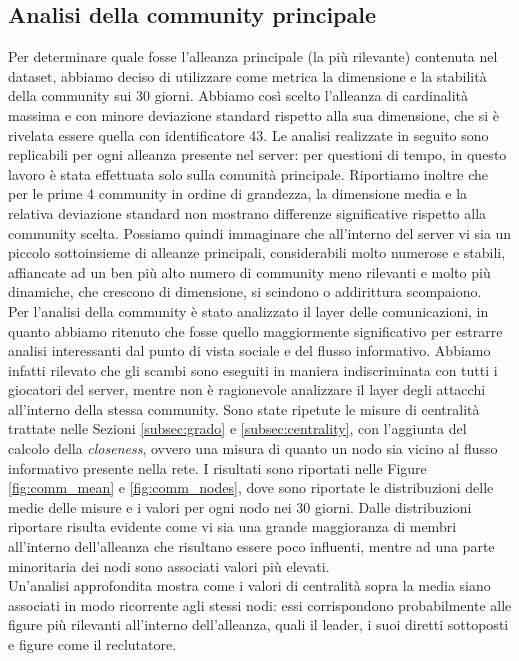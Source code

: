 \subsection{Analisi della community principale}
Per determinare quale fosse l'alleanza principale (la più rilevante) contenuta nel dataset, abbiamo deciso di utilizzare come metrica la dimensione e la stabilità della community sui 30 giorni. Abbiamo così scelto l'alleanza di cardinalità massima e con minore deviazione standard rispetto alla sua dimensione, che si è rivelata essere quella con identificatore 43. Le analisi realizzate in seguito sono replicabili per ogni alleanza presente nel server: per questioni di tempo, in questo lavoro è stata effettuata solo sulla comunità principale. Riportiamo inoltre che per le prime 4 community in ordine di grandezza, la dimensione media e la relativa deviazione standard non mostrano differenze significative rispetto alla community scelta. Possiamo quindi immaginare che all'interno del server vi sia un piccolo sottoinsieme di alleanze principali, considerabili molto numerose e stabili, affiancate ad un ben più alto numero di community meno rilevanti e molto più dinamiche, che crescono di dimensione, si scindono o addirittura scompaiono.\\
Per l'analisi della community è stato analizzato il layer delle comunicazioni, in quanto abbiamo ritenuto che fosse quello maggiormente significativo per estrarre analisi interessanti dal punto di vista sociale e del flusso informativo. Abbiamo infatti rilevato che gli scambi sono eseguiti in maniera indiscriminata con tutti i giocatori del server, mentre non è ragionevole analizzare il layer degli attacchi all'interno della stessa community.
Sono state ripetute le misure di centralità trattate nelle Sezioni \ref{subsec:grado} e \ref{subsec:centrality}, con l'aggiunta del calcolo della \textit{closeness}, ovvero una misura di quanto un nodo sia vicino al flusso informativo presente nella rete. I risultati sono riportati nelle Figure \ref{fig:comm_mean}  e \ref{fig:comm_nodes}, dove sono riportate le distribuzioni delle medie delle misure e i valori per ogni nodo nei 30 giorni. Dalle distribuzioni riportare risulta evidente come vi sia una grande maggioranza di membri all'interno dell'alleanza che risultano essere poco influenti, mentre ad una parte minoritaria dei nodi sono associati valori più elevati.\\
Un'analisi approfondita mostra come i valori di centralità sopra la media siano associati in modo ricorrente agli stessi nodi: essi corrispondono probabilmente alle figure più rilevanti all'interno dell'alleanza, quali il leader, i suoi diretti sottoposti e figure come il reclutatore.
